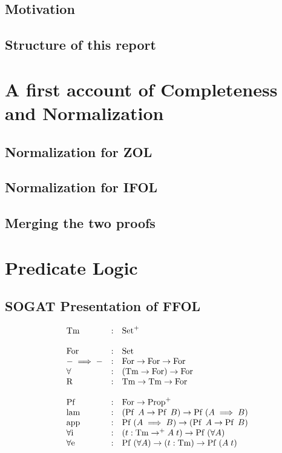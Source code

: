 \documentclass[10pt,a4paper]{article}
\begin{document}
		\subsection{Motivation}
		\subsection{Structure of this report}
	\section{A first account of Completeness and Normalization}
		\subsection{Normalization for ZOL}
		\subsection{Normalization for IFOL}
		\subsection{Merging the two proofs}
	\section{Predicate Logic}
		\subsection{SOGAT Presentation of FFOL}
		
		\begin{tcolorbox}
			\[
			\begin{array}{lcl}
				\operatorname{Tm} & : & \operatorname{Set}^+ \\
				\\
				\operatorname{For} & : & \operatorname{Set} \\
				- \implies - & : & \operatorname{For} \rightarrow \operatorname{For} \rightarrow \operatorname{For}\\
				\forall & : & (\operatorname{Tm} \rightarrow \operatorname{For}) \rightarrow \operatorname{For} \\
				\operatorname{R} & : & \operatorname{Tm} \rightarrow \operatorname{Tm} \rightarrow \operatorname{For}\\
				\\
				\operatorname{Pf}\; & : & \operatorname{For} \rightarrow \operatorname{Prop}^+ \\
				\operatorname{lam} & : & (\operatorname{Pf}\; A \rightarrow \operatorname{Pf}\; B) \rightarrow \operatorname{Pf}\; (A \implies B)\\
				\operatorname{app} & : & \operatorname{Pf}\; (A \implies B) \rightarrow (\operatorname{Pf}\; A \rightarrow \operatorname{Pf}\; B)\\
				\operatorname{\operatorname{\forall i}} & : & (t : \operatorname{Tm} \rightarrow^+ A\;t) \rightarrow \operatorname{Pf}\; (\forall A)\\
				\operatorname{\operatorname{\forall e}} & : & \operatorname{Pf}\; (\forall A) \rightarrow (t : \operatorname{Tm}) \rightarrow \operatorname{Pf}\; (A\;t)\\
			\end{array}
			\]
		\end{tcolorbox}
	
\end{document}
